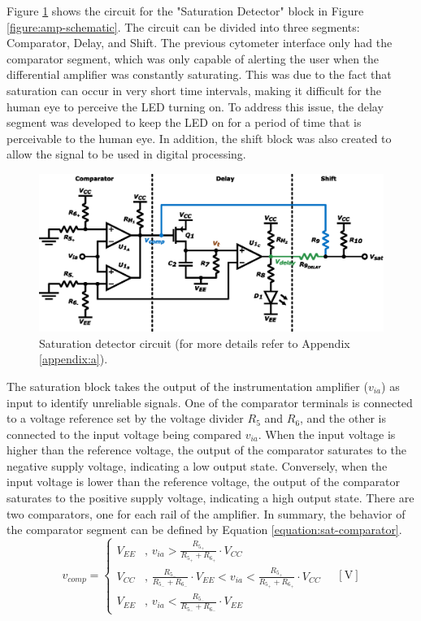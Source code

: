 Figure \ref{figure:sat} shows the circuit for the "Saturation Detector" block in Figure \ref{figure:amp-schematic}. The circuit can be divided into three segments: Comparator, Delay, and Shift. The previous cytometer interface only had the comparator segment, which was only capable of alerting the user when the differential amplifier was constantly saturating. This was due to the fact that saturation can occur in very short time intervals, making it difficult for the human eye to perceive the \ac{LED} turning on. To address this issue, the delay segment was developed to keep the \ac{LED} on for a period of time that is perceivable to the human eye. In addition, the shift block was also created to allow the signal to be used in digital processing.

\begin{figure}[!ht]
    \centering
    \includegraphics[width=.85\textwidth]{images/chapter_4/channel/sat.eps}
    \caption{Saturation detector circuit (for more details refer to Appendix \ref{appendix:a}).}
    \label{figure:sat}
\end{figure}

The saturation block takes the output of the instrumentation amplifier ($v_{ia}$) as input to identify unreliable signals. One of the comparator terminals is connected to a voltage reference set by the voltage divider $R_5$ and $R_6$, and the other is connected to the input voltage being compared $v_{ia}$. When the input voltage is higher than the reference voltage, the output of the comparator saturates to the negative supply voltage, indicating a low output state. Conversely, when the input voltage is lower than the reference voltage, the output of the comparator saturates to the positive supply voltage, indicating a high output state. There are two comparators, one for each rail of the amplifier. In summary, the behavior of the comparator segment can be defined by Equation \ref{equation:sat-comparator}.
\begin{equation}
    v_{comp} =
    \begin{cases}
      V_{EE}&, \, v_{ia} > \frac{R_{5_+}}{R_{5_+}+R_{6_+}} \cdot V_{CC}\\
      V_{CC}&, \, \frac{R_{5_-}}{R_{5_-}+R_{6_-}} \cdot V_{EE} < v_{ia} < \frac{R_{5_+}}{R_{5_+}+R_{6_+}} \cdot V_{CC}\\
      V_{EE}&, \, v_{ia} < \frac{R_{5_-}}{R_{5_-}+R_{6_-}} \cdot V_{EE}
    \end{cases}
    \quad [\mathrm{V}]
    \label{equation:sat-comparator}
\end{equation}

